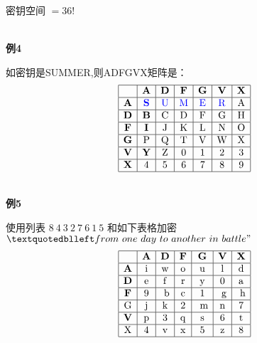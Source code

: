 \documentclass{article}
\begin{document}
密钥空间 $=36!$

~\\

\textbf{例4}

如密钥是SUMMER,则ADFGVX矩阵是：
$$
\begin{array}{|c|c|c|c|c|c|c|}
\hline & \mathbf{A} & \mathbf{D} & \mathbf{F} & \mathbf{G} & \mathbf{V} & \mathbf{X} \\
\hline \mathbf{A} &{\color{blue}\mathbf{S}} & {\color{blue}\mathrm{U}} & {\color{blue}\mathrm{M}} & {\color{blue}\mathrm{E}} & {\color{blue}\mathrm{R}} & \mathrm{A} \\
\hline \mathbf{D} &\mathbf{B} & \mathrm{C} & \mathrm{D} & \mathrm{F} & \mathrm{G} & \mathrm{H} \\
\hline \mathbf{F}&\mathbf{I} &  \mathrm{J} & \mathrm{K} & \mathrm{L} & \mathrm{N} & \mathrm{O} \\
\hline \mathbf{G}&\mathrm{P} & \mathrm{Q} & \mathrm{T} & \mathrm{V} & \mathrm{W}& \mathrm{X}  \\
\hline \mathbf{V}&\mathbf{Y} & \mathrm{Z} & 0& \mathrm{1} & \mathrm{2} & \mathrm{3} \\
\hline \mathbf{X}&\mathrm{4} & \mathrm{5} & \mathrm{6} & 7 & \mathrm{8} & 9 \\
\hline
\end{array}\\
$$


~\\

\textbf{例5}

使用列表\textbf{ $8\ 4\ 3\ 2\ 7\ 6\ 1\ 5$ }和如下表格加密\textit{$“from\ one\ day\ to\ another\ in\ battle"$}
$$
\begin{array}{|c|c|c|c|c|c|c|}
\hline & \mathbf{A} & \mathbf{D} & \mathbf{F} & \mathbf{G} & \mathbf{V} & \mathbf{X} \\
\hline \mathbf{A} & \mathrm{i} & \mathrm{w} & \mathrm{o} & \mathrm{u} & \mathrm{l} & \mathrm{d} \\
\hline \mathbf{D} & \mathrm{e} & \mathrm{f} & \mathrm{r} & \mathrm{y} & 0 & \mathrm{a} \\
\hline \mathbf{F} & 9 & \mathrm{~b} & \mathrm{c} & 1 & \mathrm{~g} & \mathrm{~h} \\
\hline \mathrm{G} & \mathrm{j} & \mathrm{k} & 2 & \mathrm{~m} & \mathrm{n} & 7 \\
\hline \mathbf{V} & \mathrm{p} & 3 & \mathrm{q} & \mathrm{s} & 6 & \mathrm{t} \\
\hline \mathrm{X} & 4 & \mathrm{v} & \mathrm{x} & 5 & \mathrm{z} & 8 \\
\hline
\end{array}\\
$$
\end{document}
